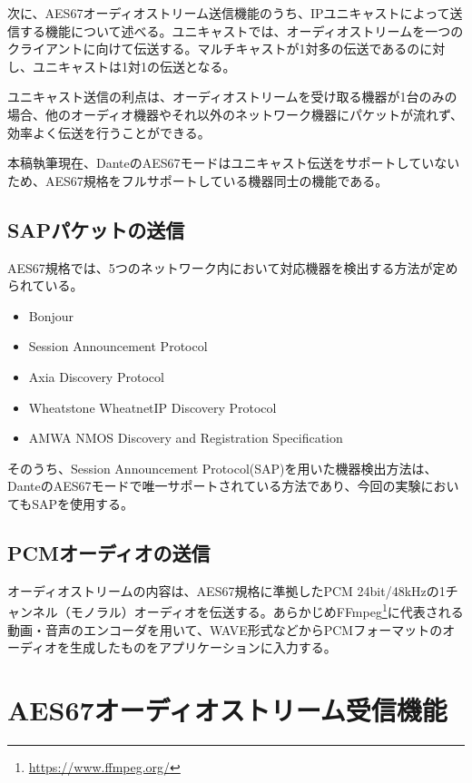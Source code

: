 次に、AES67オーディオストリーム送信機能のうち、IPユニキャストによって送信する機能について述べる。ユニキャストでは、オーディオストリームを一つのクライアントに向けて伝送する。マルチキャストが1対多の伝送であるのに対し、ユニキャストは1対1の伝送となる。

ユニキャスト送信の利点は、オーディオストリームを受け取る機器が1台のみの場合、他のオーディオ機器やそれ以外のネットワーク機器にパケットが流れず、効率よく伝送を行うことができる。

本稿執筆現在、DanteのAES67モードはユニキャスト伝送をサポートしていないため、AES67規格をフルサポートしている機器同士の機能である。

\subsection{SAPパケットの送信}

AES67規格では、5つのネットワーク内において対応機器を検出する方法が定められている\cite{aes67-2018}。

\begin{itemize}
  \item {Bonjour}
  \item {Session Announcement Protocol}
  \item {Axia Discovery Protocol}
  \item {Wheatstone WheatnetIP Discovery Protocol}
  \item {AMWA NMOS Discovery and Registration Specification}
\end{itemize}

そのうち、Session Announcement Protocol(SAP)を用いた機器検出方法は、DanteのAES67モードで唯一サポートされている方法であり、今回の実験においてもSAPを使用する。

\subsection{PCMオーディオの送信}

オーディオストリームの内容は、AES67規格に準拠したPCM 24bit/48kHzの1チャンネル（モノラル）オーディオを伝送する。あらかじめFFmpeg\footnote{\url{https://www.ffmpeg.org/}}に代表される動画・音声のエンコーダを用いて、WAVE形式などからPCMフォーマットのオーディオを生成したものをアプリケーションに入力する。

\section{AES67オーディオストリーム受信機能}

